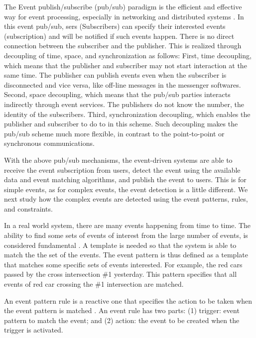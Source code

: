 \documentclass[12pt,journal,draftcls,letterpaper,onecolumn]{elsarticle}
\begin{document}
The Event publish/subscribe (pub/sub) paradigm is the efficient and
effective way for event processing, especially in networking and
distributed systems \cite{DBLP:journals/csur/EugsterFGK03}. In this
event pub/sub, sers (Subscribers) can specify their interested
events (subscription) and will be notified if such events happen.
There is no direct connection between the subscriber and the
publisher. This is realized through decoupling of time, space, and
synchronization as follows: First, time decoupling, which means that
the publisher and subscriber may not start interaction at the same
time. The publisher can publish events even when the subscriber is
disconnected and vice versa, like off-line messages in the messenger
softwares. Second, space decoupling, which means that the pub/sub
parties interacts indirectly through event services. The publishers
do not know the number, the identity of the subscribers. Third,
synchronization decoupling, which enables the publisher and
subscriber to do  to in this scheme. Such decoupling makes the
pub/sub scheme much more flexible, in contrast to the point-to-point
or synchronous communications.

With the above pub/sub mechanisms, the event-driven systems are able
to receive the event subscription from users, detect the event using
the available data and event matching algorithms, and publish the
event to users. This is for simple events, as for complex events,
the event detection is a little different. We next study how the
complex events are detected using the event patterns, rules, and
constraints.

In a real world system, there are many events happening from time to
time. The ability to find some sets of events of interest from the
large number of events, is considered fundamental \cite{1483263}. A
template is needed so that the system is able to match the the set
of the events. The event pattern is thus defined as a template that
matches some specific sets of events interested. For example, the
red cars passed by the cross intersection \#1 yesterday. This
pattern specifies that all events of red car crossing the \#1
intersection are matched.


An event pattern rule is a reactive one that specifies the action to
be taken when the event pattern is matched \cite{1483263}
\cite{DBLP:conf/debs/SchieferRRS07}. An event rule has two parts:
(1) trigger: event pattern to match the event; and (2) action: the
event to be created when the trigger is activated.
\end{document}

